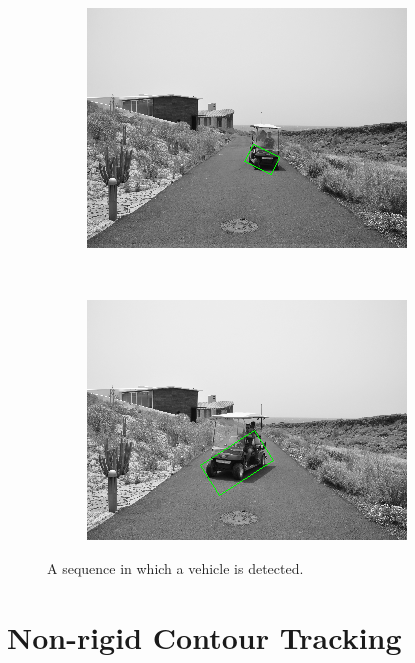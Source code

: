 \begin{figure}[h!]
\begin{subfigure}[b]{0.24\columnwidth}
	    \includegraphics[width=\textwidth]{sequence/seq7}\label{fig:seq7}
        \end{subfigure}%
        ~
        \begin{subfigure}[b]{0.24\columnwidth}
	    \includegraphics[width=\textwidth]{sequence/seq8}\label{fig:seq8}
        \end{subfigure}%
        \caption{A sequence in which a vehicle is detected.}\label{fig:cp01_sequence_example}
\end{figure}

\graphicspath{{./images/chapter02/bmps/}{./images/chapter02/vects/}{./images/chapter02/}}
\section{Non-rigid Contour Tracking}\label{ch:chapter02_02}

